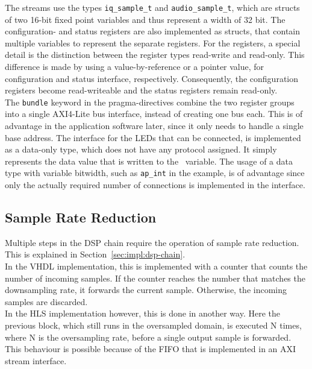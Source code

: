 The streams use the types \texttt{iq\_sample\_t} and \texttt{audio\_sample\_t}, which are structs of two 16-bit fixed point variables and thus represent a width of 32 bit.
The configuration- and status registers are also implemented as structs, that contain multiple variables to represent the separate registers.
For the registers, a special detail is the distinction between the register types read-write and read-only.
This difference is made by using a value-by-reference or a pointer value, for configuration and status interface, respectively.
Consequently, the configuration registers become read-writeable and the status registers remain read-only.\\

The \texttt{bundle} keyword in the pragma-directives combine the two register groups into a single AXI4-Lite bus interface, instead of creating one bus each.
This is of advantage in the application software later, since it only needs to handle a single base address.
The interface for the LEDs that can be connected, is implemented as a data-only type, which does not have any protocol assigned.
It simply represents the data value that is written to the \cplusplus\ variable.
The usage of a data type with variable bitwidth, such as \texttt{ap\_int} in the example, is of advantage since only the actually required number of connections is implemented in the interface.

\subsection{Sample Rate Reduction}
\label{sec:impl:hls:sample_rate_reduction}

Multiple steps in the DSP chain require the operation of sample rate reduction.
This is explained in Section~\ref{sec:impl:dsp-chain}.\\

In the VHDL implementation, this is implemented with a counter that counts the number of incoming samples.
If the counter reaches the number that matches the downsampling rate, it forwards the current sample.
Otherwise, the incoming samples are discarded.\\

In the HLS implementation however, this is done in another way.
Here the previous block, which still runs in the oversampled domain, is executed N times, where N is the oversampling rate, before a single output sample is forwarded.
This behaviour is possible because of the FIFO that is implemented in an AXI stream interface.\\

